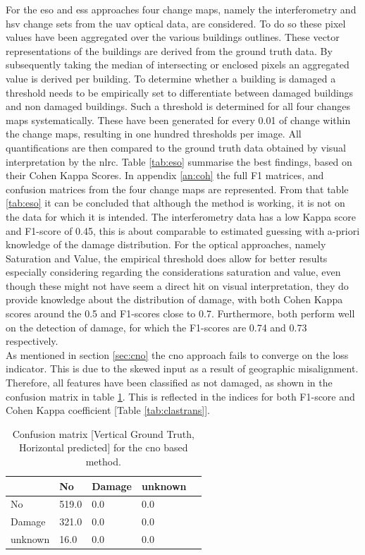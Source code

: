 \noindent For the \ac{eso} and \ac{ess} approaches four change maps, namely the interferometry and \ac{hsv} change sets from the \ac{uav} optical data, are considered. To do so these pixel values have been aggregated over the various buildings outlines. These vector representations of the buildings are derived from the ground truth data. By subsequently taking the median of intersecting or enclosed pixels an aggregated value is derived per building. To determine whether a building is damaged a threshold needs to be empirically set to differentiate between damaged buildings and non damaged buildings. Such a threshold is determined for all four changes maps systematically. These have been generated for every 0.01 of change within the change maps, resulting in one hundred thresholds per image. All quantifications are then compared to the ground truth data obtained by visual interpretation by the \ac{nlrc}. Table \ref{tab:eso} summarise the best findings, based on their Cohen Kappa Scores. In appendix \ref{an:coh} the full F1 matrices, and confusion matrices from the four change maps are represented. From that table \ref{tab:eso} it can be concluded that although the method is working, it is not on the data for which it is intended. The interferometry data has a low Kappa score and F1-score of 0.45, this is about comparable to estimated guessing with a-priori knowledge of the damage distribution. For the optical approaches, namely Saturation and Value, the empirical threshold does allow for better results especially considering regarding the considerations saturation and value, even though these might not have seem a direct hit on visual interpretation, they do provide knowledge about the distribution of damage, with both Cohen Kappa scores around the 0.5 and F1-scores close to 0.7. Furthermore, both perform well on the detection of damage, for which the F1-scores are 0.74 and 0.73 respectively.\\

\noindent  As mentioned in section \ref{sec:cno} the \ac{cno} approach fails to converge on the loss indicator. This is due to the skewed input as a result of geographic misalignment. Therefore, all features have been classified as not damaged, as shown in the confusion matrix in table \ref{tab:confcno}. This is reflected in the indices for both F1-score and Cohen Kappa coefficient [Table \ref{tab:clastrans}]. 

\begin{table} [H]
	\centering
	\footnotesize
	\captionsetup{justification=raggedright,singlelinecheck=false}
	\caption{Confusion matrix [Vertical Ground Truth, Horizontal predicted] for the \ac{cno} based method. }	
	\begin{tabular}{l|llll}
		& No    & Damage & unknown &  \\ \hline
		No      & 519.0 & 0.0    & 0.0     &  \\
		Damage  & 321.0 & 0.0    & 0.0     &  \\
		unknown & 16.0  & 0.0    & 0.0     &  \\
	\end{tabular}
\label{tab:confcno}
\end{table}

